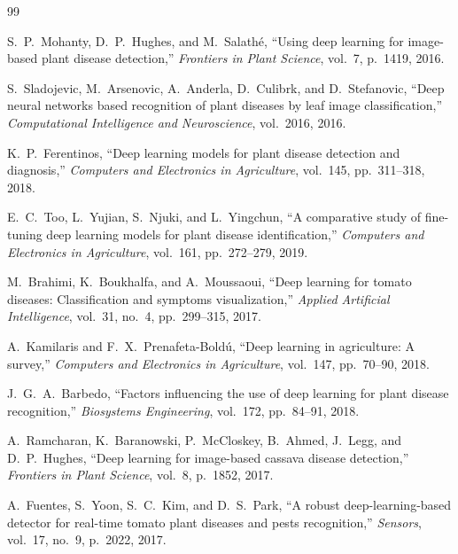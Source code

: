 \documentclass[11pt,a4paper]{article}
\begin{document}
\newpage
\begin{thebibliography}{99}

S.\ P.\ Mohanty, D.\ P.\ Hughes, and M.\ Salathé,
``Using deep learning for image-based plant disease detection,''
\textit{Frontiers in Plant Science}, vol.\ 7, p.\ 1419, 2016.

S.\ Sladojevic, M.\ Arsenovic, A.\ Anderla, D.\ Culibrk, and D.\ Stefanovic,
``Deep neural networks based recognition of plant diseases by leaf image
classification,''
\textit{Computational Intelligence and Neuroscience}, vol.\ 2016, 2016.

K.\ P.\ Ferentinos,
``Deep learning models for plant disease detection and diagnosis,''
\textit{Computers and Electronics in Agriculture}, vol.\ 145, pp.\ 311--318,
2018.

E.\ C.\ Too, L.\ Yujian, S.\ Njuki, and L.\ Yingchun,
``A comparative study of fine-tuning deep learning models for plant disease
identification,''
\textit{Computers and Electronics in Agriculture}, vol.\ 161, pp.\ 272--279,
2019.

M.\ Brahimi, K.\ Boukhalfa, and A.\ Moussaoui,
``Deep learning for tomato diseases: Classification and symptoms
visualization,''
\textit{Applied Artificial Intelligence}, vol.\ 31, no.\ 4, pp.\ 299--315,
2017.

A.\ Kamilaris and F.\ X.\ Prenafeta-Boldú,
``Deep learning in agriculture: A survey,''
\textit{Computers and Electronics in Agriculture}, vol.\ 147, pp.\ 70--90,
2018.

J.\ G.\ A.\ Barbedo,
``Factors influencing the use of deep learning for plant disease
recognition,''
\textit{Biosystems Engineering}, vol.\ 172, pp.\ 84--91, 2018.

A.\ Ramcharan, K.\ Baranowski, P.\ McCloskey, B.\ Ahmed, J.\ Legg, and
D.\ P.\ Hughes,
``Deep learning for image-based cassava disease detection,''
\textit{Frontiers in Plant Science}, vol.\ 8, p.\ 1852, 2017.

A.\ Fuentes, S.\ Yoon, S.\ C.\ Kim, and D.\ S.\ Park,
``A robust deep-learning-based detector for real-time tomato plant diseases
and pests recognition,''
\textit{Sensors}, vol.\ 17, no.\ 9, p.\ 2022, 2017.


\end{thebibliography}
\end{document}
